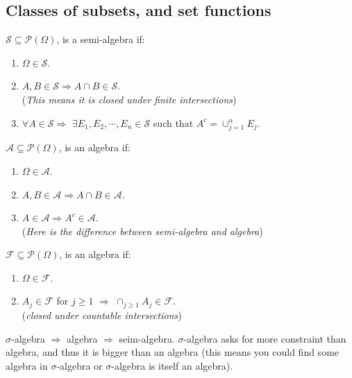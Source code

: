 \subsection{Classes of subsets, and set functions}
\begin{define}
  $\mathcal{S} \subseteq \mathcal{P}(\Omega)$, is a semi-algebra if:
  \begin{enumerate}[itemsep=0mm]
  \item $\Omega \in \mathcal{S}$.
  \item $A, B\in \mathcal{S} \Rightarrow A\cap B\in \mathcal{S}$. \\ (\emph{This means it is closed under finite intersections})
  \item $\forall A\in\mathcal{S} \Rightarrow$ $\exists E_1, E_2, \cdots, E_n\in\mathcal{S}$ such that $A^c = \cup_{j=1}^n E_j$.
  \end{enumerate}
\end{define}

\begin{define}[algebra]
  $\mathcal{A} \subseteq \mathcal{P}(\Omega)$, is an algebra if:
  \begin{enumerate}[itemsep=0mm]
  \item $\Omega \in \mathcal{A}$.
  \item $A, B\in \mathcal{A} \Rightarrow A\cap B\in \mathcal{A}$.
  \item $A\in\mathcal{A} \Rightarrow A^c\in\mathcal{A}$. \\ (\emph{Here is the difference between semi-algebra and algebra})
  \end{enumerate}
\end{define}

\begin{define}
  $\mathcal{F} \subseteq \mathcal{P}(\Omega)$, is an algebra if:
  \begin{enumerate}[itemsep=0mm]
  \item $\Omega\in\mathcal{F}$.
  \item $A_j\in\mathcal{F}$ for $j\geq 1$ $\Rightarrow$ $\cap_{j\geq 1} A_j \in \mathcal{F}$. \\ (\emph{closed under countable intersections})
  \end{enumerate}
\end{define}

\begin{remark}
  $\sigma$-algebra $\Rightarrow$ algebra $\Rightarrow$ seim-algebra.
  $\sigma$-algebra asks for more constraint than algebra, and thus it is bigger than an algebra (this means you could find some algebra in $\sigma$-algebra or $\sigma$-algebra is itself an algebra).
\end{remark}

